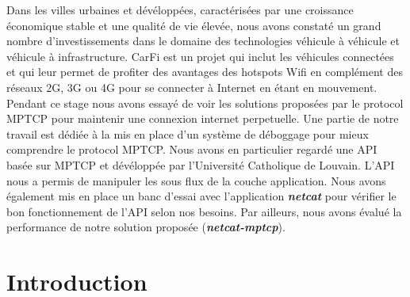 \documentclass[a4paper,11pt]{article}
\begin{document}
		\begin{description}

			\item \hspace{2cm} Dans les villes urbaines et dévéloppées, caractérisées par une croissance économique stable et une qualité de vie élevée, nous avons constaté un grand nombre d'investissements dans le domaine des technologies véhicule à véhicule et véhicule à infrastructure. CarFi est un projet qui inclut les véhicules connectées et qui leur permet de profiter des avantages des hotspots Wifi en complément des réseaux 2G, 3G ou 4G pour se connecter à Internet en étant en mouvement. Pendant ce stage nous avons essayé de voir les solutions proposées par le protocol MPTCP pour maintenir une connexion internet perpetuelle. Une partie de notre travail est dédiée à la mis en place d'un système de déboggage pour mieux comprendre le protocol MPTCP. Nous avons en particulier regardé une API basée sur MPTCP et dévéloppée par l'Université Catholique de Louvain. L'API nous a permis de manipuler les sous flux de la couche application. Nous avons également mis en place un banc d'essai avec l'application \textbf{\emph{netcat}} pour vérifier le bon fonctionnement de l'API selon nos besoins. Par ailleurs, nous avons évalué la performance de notre solution proposée (\textbf{\emph{netcat-mptcp}}).
			
		\end{description}
		
	

	\clearpage

	\setcounter{tocdepth}{3}

	\tableofcontents

	\clearpage

	
	\section{Introduction}

		\vspace{0.5cm}
\end{document}
